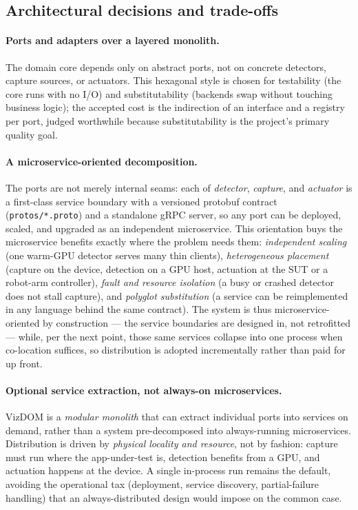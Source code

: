 \documentclass[11pt,a4paper]{article}
\newcommand{\code}[1]{\texttt{#1}}
\begin{document}
\subsection{Architectural decisions and trade-offs}
\paragraph{Ports and adapters over a layered monolith.} The domain core depends only
on abstract ports, not on concrete detectors, capture sources, or actuators. This
hexagonal style is chosen for testability (the core runs with no I/O) and
substitutability (backends swap without touching business logic); the accepted cost
is the indirection of an interface and a registry per port, judged worthwhile
because substitutability is the project's primary quality goal.

\paragraph{A microservice-oriented decomposition.} The ports are not merely internal
seams: each of \emph{detector}, \emph{capture}, and \emph{actuator} is a first-class
service boundary with a versioned protobuf contract (\code{protos/*.proto}) and a
standalone gRPC server, so any port can be deployed, scaled, and upgraded as an
independent microservice. This orientation buys the microservice benefits exactly
where the problem needs them: \emph{independent scaling} (one warm-GPU detector
serves many thin clients), \emph{heterogeneous placement} (capture on the device,
detection on a GPU host, actuation at the SUT or a robot-arm controller),
\emph{fault and resource isolation} (a busy or crashed detector does not stall
capture), and \emph{polyglot substitution} (a service can be reimplemented in any
language behind the same contract). The system is thus microservice-oriented by
construction --- the service boundaries are designed in, not retrofitted --- while,
per the next point, those same services collapse into one process when co-location
suffices, so distribution is adopted incrementally rather than paid for up front.

\paragraph{Optional service extraction, not always-on microservices.} VizDOM is a
\emph{modular monolith} that can extract individual ports into services on demand,
rather than a system pre-decomposed into always-running microservices. Distribution
is driven by \emph{physical locality and resource}, not by fashion: capture must run
where the app-under-test is, detection benefits from a GPU, and actuation happens at
the device. A single in-process run remains the default, avoiding the operational
tax (deployment, service discovery, partial-failure handling) that an
always-distributed design would impose on the common case.
\end{document}
